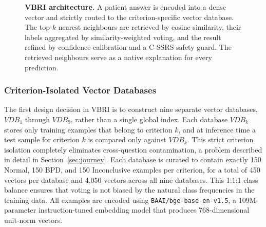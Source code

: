 \documentclass[11pt]{article}
\newcommand{\vbri}{VBRI}
\begin{document}
\begin{figure}[H]
{
}
\caption{\textbf{\vbri{} architecture.} A patient answer is encoded into a dense vector and
strictly routed to the criterion-specific vector database. The top-$k$ nearest neighbours are
retrieved by cosine similarity, their labels aggregated by similarity-weighted voting, and the
result refined by confidence calibration and a C-SSRS safety guard. The retrieved neighbours
serve as a native explanation for every prediction.}
\label{fig:vbri_arch}
\end{figure}

\subsubsection{Criterion-Isolated Vector Databases}

The first design decision in \vbri{} is to construct nine separate vector databases, $VDB_1$
through $VDB_9$, rather than a single global index. Each database $VDB_k$ stores only training
examples that belong to criterion $k$, and at inference time a test sample for criterion $k$ is
compared only against $VDB_k$. This strict criterion isolation completely eliminates
cross-question contamination, a problem described in detail in Section~\ref{sec:journey}. Each
database is curated to contain exactly 150 Normal, 150 BPD, and 150 Inconclusive examples per
criterion, for a total of 450 vectors per database and 4,050 vectors across all nine databases.
This 1:1:1 class balance ensures that voting is not biased by the natural class frequencies in
the training data. All examples are encoded using \texttt{BAAI/bge-base-en-v1.5}, a
109M-parameter instruction-tuned embedding model that produces 768-dimensional unit-norm vectors.
\end{document}
